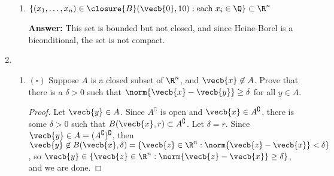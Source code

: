 \documentclass[a5paper]{article}
\theoremstyle{definition}%
\numberwithin{exercise}{section}
\theoremstyle{remark}%
\begin{document}
\begin{enumerate}
\begin{enumerate}[label=(\alph*)]
	\item $\{(x_1, \ldots, x_n)\in\closure{B}(\vecb{0},10): \text{each }x_i\in \Q\}\subset \R^n$
	
	\textbf{Answer:} This set is bounded but not closed, and since Heine-Borel is a biconditional, the set is not compact. 
	\end{enumerate}
\item 
	\begin{enumerate}[label=(\alph*)]
	\item $(\square)$ Suppose $A$ is a closed subset of $\R^n$, and $\vecb{x}\not\in A$. Prove that there is a $\delta>0$ such that $\norm{\vecb{x}-\vecb{y}}\geq\delta$ for all $y\in A$. 
	
	\begin{proof}\mbox{}
	Let $\vecb{y}\in A$. Since $A^\complement$ is open and $\vecb{x}\in A^\complement$, there is some $\delta>0$ such that $B(\vecb{x},r)\subset A^\complement$. 
	Let $\delta=r$. Since $\vecb{y}\in A=(A^\complement)^\complement$, then $\vecb{y}\not\in B(\vecb{x},\delta)=\{\vecb{z}\in\R^n:\norm{\vecb{z}-\vecb{x}}<\delta\}$, so $\vecb{y}\in\{\vecb{z}\in\R^n:\norm{\vecb{z}-\vecb{x}}\geq\delta\}$, and we are done. 
	\end{proof}
	

\end{enumerate}
\end{enumerate}
\end{document}
